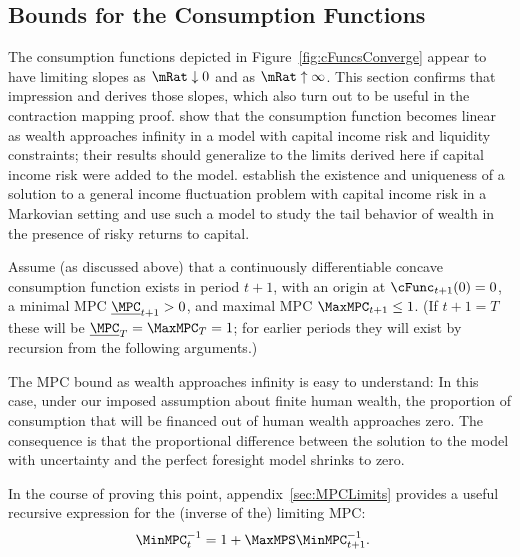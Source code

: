 \documentclass[BufferStockTheory]{subfiles}
\begin{document}
\hypertarget{Bounds-for-the-Consumption-Functions}{}
\subsection{Bounds for the Consumption Functions}

The consumption functions depicted in Figure~\ref{fig:cFuncsConverge} appear
to have limiting slopes as $\mRat \downarrow 0$ and as $\mRat \uparrow
\infty$.  This section confirms that impression and derives those
slopes, which also turn out to be useful in the contraction
mapping proof.  \cite{benhabibWealth} show that the consumption function
becomes linear as wealth approaches infinity in a model with capital income risk and liquidity
constraints; their results should generalize to the limits derived here if capital income risk were added to the model.  \cite{MaStachurskiToda2020JET} establish the existence and uniqueness of a solution to a general income fluctuation problem with capital income risk in a Markovian setting and use such a model to study the tail behavior of wealth in the presence of risky returns to capital.

\newcommand{\NewMaxMinMPC}{\ushort{\MPC}}

Assume (as discussed above) that a continuously differentiable
concave consumption function exists in period $t+1$, with an origin at
$\cFunc_{t+1}(0)=0$, a minimal MPC $\NewMaxMinMPC_{t+1}>0$, and
maximal MPC $\MaxMPC_{t+1} \leq 1$.  (If $t+1 = T$ these will be
$\NewMaxMinMPC_{T}=\MaxMPC_{T}=1$; for earlier periods they will exist
by recursion from the following arguments.)

The MPC bound as wealth approaches infinity is easy to understand: In this case,
under our imposed assumption about finite human wealth, the proportion of consumption
that will be financed out of human wealth approaches zero. The
consequence is that the proportional difference between the solution to the
model with uncertainty and the perfect foresight model shrinks to zero.

\hypertarget{MPCnvrsLower}{}
\hypertarget{WRICCond}{}
In the course of proving this point, appendix~\ref{sec:MPCLimits}  provides a useful recursive expression for the (inverse of the) limiting MPC: 
\begin{align}
  \MinMPC_{t}^{-1}  & = 1+\MaxMPS \MinMPC_{t+1}^{-1} \label{eq:MinMPCInv}.
\end{align}
\end{document}
